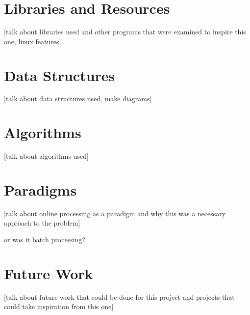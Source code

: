 \documentclass[12pt]{report}
\begin{document}
\section*{Libraries and Resources}
[talk about libraries used and other 
programs that were examined to inspire 
this one, linux features]

\section*{Data Structures}
[talk about data structures used, make diagrams]

\section*{Algorithms}
[talk about algorithms used]

\section*{Paradigms}
[talk about online processing as a paradigm
and why this was a necessary approach to the 
problem]

or was it batch processing?


\section*{Future Work}
[talk about future work that could be done for
this project and projects that could take inspiration
from this one]
\end{document}

